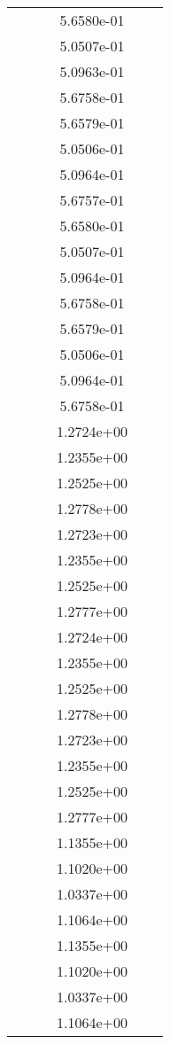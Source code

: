 \begin{xltabular}{\textwidth}{r|rS[table-format=1.3e+2]S[table-format=1.4e+2]S[table-format=1.4e+2]S[table-format=-1.5]}
&  &  & 5.6580e-01 & & \\
&  &  & 5.0507e-01 & & \\
&  &  & 5.0963e-01 & & \\
&  &  & 5.6758e-01 & & \\
&  &  & 5.6579e-01 & & \\
&  &  & 5.0506e-01 & & \\
&  &  & 5.0964e-01 & & \\
&  &  & 5.6757e-01 & & \\
&  &  & 5.6580e-01 & & \\
&  &  & 5.0507e-01 & & \\
&  &  & 5.0964e-01 & & \\
&  &  & 5.6758e-01 & & \\
&  &  & 5.6579e-01 & & \\
&  &  & 5.0506e-01 & & \\
&  &  & 5.0964e-01 & & \\
&  &  & 5.6758e-01 & & \\
&  &  & 1.2724e+00 & & \\
&  &  & 1.2355e+00 & & \\
&  &  & 1.2525e+00 & & \\
&  &  & 1.2778e+00 & & \\
&  &  & 1.2723e+00 & & \\
&  &  & 1.2355e+00 & & \\
&  &  & 1.2525e+00 & & \\
&  &  & 1.2777e+00 & & \\
&  &  & 1.2724e+00 & & \\
&  &  & 1.2355e+00 & & \\
&  &  & 1.2525e+00 & & \\
&  &  & 1.2778e+00 & & \\
&  &  & 1.2723e+00 & & \\
&  &  & 1.2355e+00 & & \\
&  &  & 1.2525e+00 & & \\
&  &  & 1.2777e+00 & & \\
&  &  & 1.1355e+00 & & \\
&  &  & 1.1020e+00 & & \\
&  &  & 1.0337e+00 & & \\
&  &  & 1.1064e+00 & & \\
&  &  & 1.1355e+00 & & \\
&  &  & 1.1020e+00 & & \\
&  &  & 1.0337e+00 & & \\
&  &  & 1.1064e+00 & & \\

\end{xltabular}
